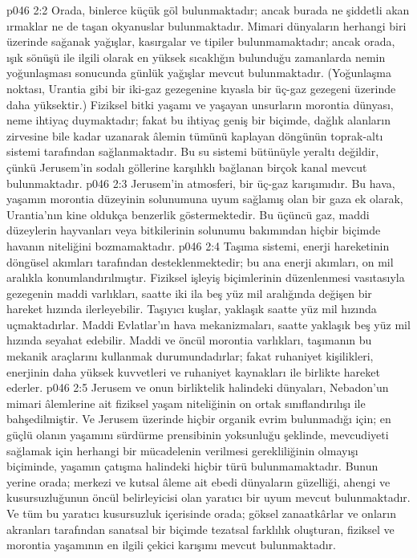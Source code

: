 \vs p046 2:2 Orada, binlerce küçük göl bulunmaktadır; ancak burada ne şiddetli akan ırmaklar ne de taşan okyanuslar bulunmaktadır. Mimari dünyaların herhangi biri üzerinde sağanak yağışlar, kasırgalar ve tipiler bulunmamaktadır; ancak orada, ışık sönüşü ile ilgili olarak en yüksek sıcaklığın bulunduğu zamanlarda nemin yoğunlaşması sonucunda günlük yağışlar mevcut bulunmaktadır. (Yoğunlaşma noktası, Urantia gibi bir iki\hyp{}gaz gezegenine kıyasla bir üç\hyp{}gaz gezegeni üzerinde daha yüksektir.) Fiziksel bitki yaşamı ve yaşayan unsurların morontia dünyası, neme ihtiyaç duymaktadır; fakat bu ihtiyaç geniş bir biçimde, dağlık alanların zirvesine bile kadar uzanarak âlemin tümünü kaplayan döngünün toprak\hyp{}altı sistemi tarafından sağlanmaktadır. Bu su sistemi bütünüyle yeraltı değildir, çünkü Jerusem’in sodalı göllerine karşılıklı bağlanan birçok kanal mevcut bulunmaktadır.
\vs p046 2:3 Jerusem’in atmosferi, bir üç\hyp{}gaz karışımıdır. Bu hava, yaşamın morontia düzeyinin solunumuna uyum sağlamış olan bir gaza ek olarak, Urantia’nın kine oldukça benzerlik göstermektedir. Bu üçüncü gaz, maddi düzeylerin hayvanları veya bitkilerinin solunumu bakımından hiçbir biçimde havanın niteliğini bozmamaktadır.
\vs p046 2:4 Taşıma sistemi, enerji hareketinin döngüsel akımları tarafından desteklenmektedir; bu ana enerji akımları, on mil aralıkla konumlandırılmıştır. Fiziksel işleyiş biçimlerinin düzenlenmesi vasıtasıyla gezegenin maddi varlıkları, saatte iki ila beş yüz mil aralığında değişen bir hareket hızında ilerleyebilir. Taşıyıcı kuşlar, yaklaşık saatte yüz mil hızında uçmaktadırlar. Maddi Evlatlar’ın hava mekanizmaları, saatte yaklaşık beş yüz mil hızında seyahat edebilir. Maddi ve öncül morontia varlıkları, taşımanın bu mekanik araçlarını kullanmak durumundadırlar; fakat ruhaniyet kişilikleri, enerjinin daha yüksek kuvvetleri ve ruhaniyet kaynakları ile birlikte hareket ederler.
\vs p046 2:5 Jerusem ve onun birliktelik halindeki dünyaları, Nebadon’un mimari âlemlerine ait fiziksel yaşam niteliğinin on ortak sınıflandırılışı ile bahşedilmiştir. Ve Jerusem üzerinde hiçbir organik evrim bulunmadığı için; en güçlü olanın yaşamını sürdürme prensibinin yoksunluğu şeklinde, mevcudiyeti sağlamak için herhangi bir mücadelenin verilmesi gerekliliğinin olmayışı biçiminde, yaşamın çatışma halindeki hiçbir türü bulunmamaktadır. Bunun yerine orada; merkezi ve kutsal âleme ait ebedi dünyaların güzelliği, ahengi ve kusursuzluğunun öncül belirleyicisi olan yaratıcı bir uyum mevcut bulunmaktadır. Ve tüm bu yaratıcı kusursuzluk içerisinde orada; göksel zanaatkârlar ve onların akranları tarafından sanatsal bir biçimde tezatsal farklılık oluşturan, fiziksel ve morontia yaşamının en ilgili çekici karışımı mevcut bulunmaktadır.
